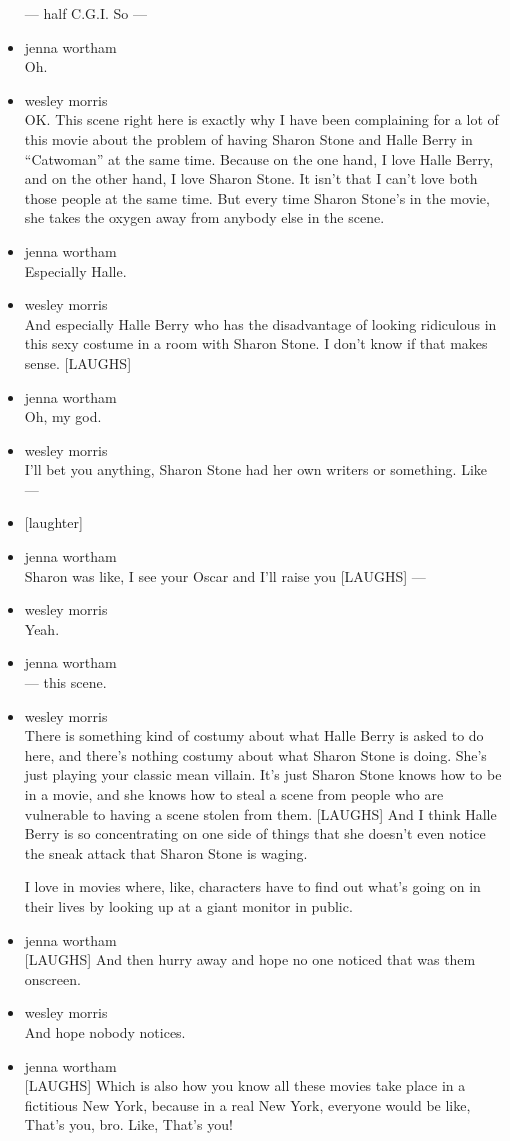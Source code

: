 \begin{itemize}
  --- half C.G.I. So ---
\item
  jenna wortham\\
  Oh.
\item
  wesley morris\\
  OK. This scene right here is exactly why I have been complaining for a
  lot of this movie about the problem of having Sharon Stone and Halle
  Berry in ``Catwoman'' at the same time. Because on the one hand, I
  love Halle Berry, and on the other hand, I love Sharon Stone. It isn't
  that I can't love both those people at the same time. But every time
  Sharon Stone's in the movie, she takes the oxygen away from anybody
  else in the scene.
\item
  jenna wortham\\
  Especially Halle.
\item
  wesley morris\\
  And especially Halle Berry who has the disadvantage of looking
  ridiculous in this sexy costume in a room with Sharon Stone. I don't
  know if that makes sense. {[}LAUGHS{]}
\item
  jenna wortham\\
  Oh, my god.
\item
  wesley morris\\
  I'll bet you anything, Sharon Stone had her own writers or something.
  Like ---
\item
  {[}laughter{]}
\item
  jenna wortham\\
  Sharon was like, I see your Oscar and I'll raise you {[}LAUGHS{]} ---
\item
  wesley morris\\
  Yeah.
\item
  jenna wortham\\
  --- this scene.
\item
  wesley morris\\
  There is something kind of costumy about what Halle Berry is asked to
  do here, and there's nothing costumy about what Sharon Stone is doing.
  She's just playing your classic mean villain. It's just Sharon Stone
  knows how to be in a movie, and she knows how to steal a scene from
  people who are vulnerable to having a scene stolen from them.
  {[}LAUGHS{]} And I think Halle Berry is so concentrating on one side
  of things that she doesn't even notice the sneak attack that Sharon
  Stone is waging.

  I love in movies where, like, characters have to find out what's going
  on in their lives by looking up at a giant monitor in public.
\item
  jenna wortham\\
  {[}LAUGHS{]} And then hurry away and hope no one noticed that was them
  onscreen.
\item
  wesley morris\\
  And hope nobody notices.
\item
  jenna wortham\\
  {[}LAUGHS{]} Which is also how you know all these movies take place in
  a fictitious New York, because in a real New York, everyone would be
  like, That's you, bro. Like, That's you!


\end{itemize}
